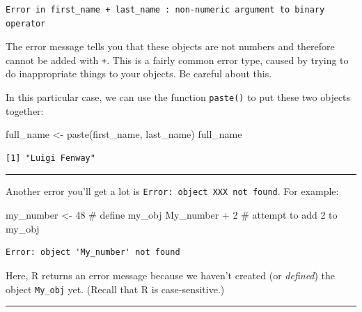 \documentclass[
  letterpaper,
  DIV=11,
  numbers=noendperiod]{scrreprt}
\newenvironment{Shaded}{\begin{snugshade}}{\end{snugshade}}
\newcommand{\CommentTok}[1]{\textcolor[rgb]{0.37,0.37,0.37}{#1}}
\newcommand{\DecValTok}[1]{\textcolor[rgb]{0.68,0.00,0.00}{#1}}
\newcommand{\FunctionTok}[1]{\textcolor[rgb]{0.28,0.35,0.67}{#1}}
\newcommand{\NormalTok}[1]{\textcolor[rgb]{0.00,0.23,0.31}{#1}}
\newcommand{\OtherTok}[1]{\textcolor[rgb]{0.00,0.23,0.31}{#1}}
\newcommand{\SpecialCharTok}[1]{\textcolor[rgb]{0.37,0.37,0.37}{#1}}
\begin{document}
\begin{verbatim}
Error in first_name + last_name : non-numeric argument to binary operator
\end{verbatim}

The error message tells you that these objects are not numbers and
therefore cannot be added with \texttt{+}. This is a fairly common error
type, caused by trying to do inappropriate things to your objects. Be
careful about this.

In this particular case, we can use the function \texttt{paste()} to put
these two objects together:

\begin{Shaded}
\begin{Highlighting}[]
\NormalTok{full\_name }\OtherTok{\textless{}{-}} \FunctionTok{paste}\NormalTok{(first\_name, last\_name)}
\NormalTok{full\_name}
\end{Highlighting}
\end{Shaded}

\begin{verbatim}
[1] "Luigi Fenway"
\end{verbatim}

\begin{center}\rule{0.5\linewidth}{0.5pt}\end{center}

Another error you'll get a lot is
\texttt{Error:\ object\ \textquotesingle{}XXX\textquotesingle{}\ not\ found}.
For example:

\begin{Shaded}
\begin{Highlighting}[]
\NormalTok{my\_number }\OtherTok{\textless{}{-}} \DecValTok{48} \CommentTok{\# define \textasciigrave{}my\_obj\textasciigrave{}}
\NormalTok{My\_number }\SpecialCharTok{+} \DecValTok{2} \CommentTok{\# attempt to add 2 to \textasciigrave{}my\_obj\textasciigrave{}}
\end{Highlighting}
\end{Shaded}

\begin{verbatim}
Error: object 'My_number' not found
\end{verbatim}

Here, R returns an error message because we haven't created (or
\emph{defined}) the object \texttt{My\_obj} yet. (Recall that R is
case-sensitive.)

\begin{center}\rule{0.5\linewidth}{0.5pt}\end{center}
\end{document}
